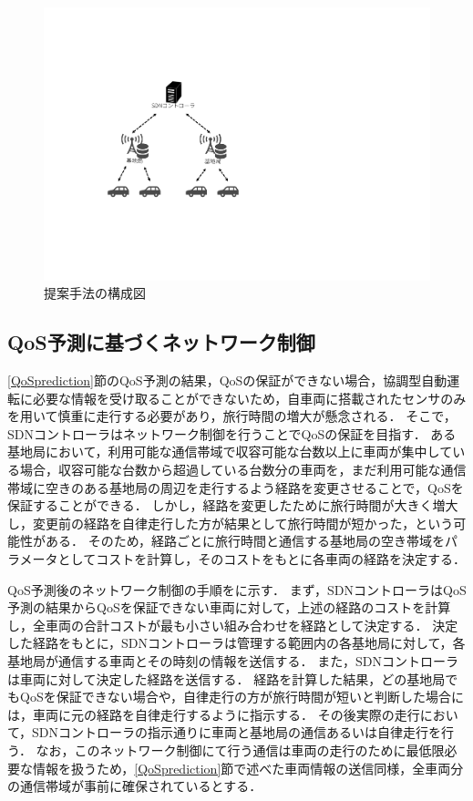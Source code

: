 \documentclass[a4paper,10pt,twocolumn,uplatex]{jsarticle}
\begin{document}
\begin{figure}[t]
	\begin{centering}
    \includegraphics[width=0.8\linewidth]{img/202210_構成図.pdf}
    \caption{提案手法の構成図}
    \label{fig:architecture}
    \end{centering}
\end{figure}

\subsection{QoS予測に基づくネットワーク制御}
\label{priority}
\ref{QoSprediction}節のQoS予測の結果，QoSの保証ができない場合，協調型自動運転に必要な情報を受け取ることができないため，自車両に搭載されたセンサのみを用いて慎重に走行する必要があり，旅行時間の増大が懸念される．
そこで，SDNコントローラはネットワーク制御を行うことでQoSの保証を目指す．
ある基地局において，利用可能な通信帯域で収容可能な台数以上に車両が集中している場合，収容可能な台数から超過している台数分の車両を，まだ利用可能な通信帯域に空きのある基地局の周辺を走行するよう経路を変更させることで，QoSを保証することができる．
しかし，経路を変更したために旅行時間が大きく増大し，変更前の経路を自律走行した方が結果として旅行時間が短かった，という可能性がある．
そのため，経路ごとに旅行時間と通信する基地局の空き帯域をパラメータとしてコストを計算し，そのコストをもとに各車両の経路を決定する．\par
QoS予測後のネットワーク制御の手順をに示す．
まず，SDNコントローラはQoS予測の結果からQoSを保証できない車両に対して，上述の経路のコストを計算し，全車両の合計コストが最も小さい組み合わせを経路として決定する．
決定した経路をもとに，SDNコントローラは管理する範囲内の各基地局に対して，各基地局が通信する車両とその時刻の情報を送信する．
また，SDNコントローラは車両に対して決定した経路を送信する．
経路を計算した結果，どの基地局でもQoSを保証できない場合や，自律走行の方が旅行時間が短いと判断した場合には，車両に元の経路を自律走行するように指示する．
その後実際の走行において，SDNコントローラの指示通りに車両と基地局の通信あるいは自律走行を行う．
なお，このネットワーク制御にて行う通信は車両の走行のために最低限必要な情報を扱うため，\ref{QoSprediction}節で述べた車両情報の送信同様，全車両分の通信帯域が事前に確保されているとする．
\end{document}
